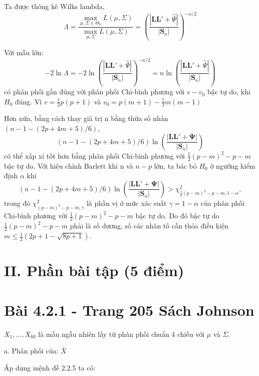 \documentclass{article}
\begin{document}
Ta được thông kê Wilks lambda,
\[
\Lambda = \frac{\max_{\mu, \Sigma \in \Theta_0} L(\mu, \Sigma)}{\max_{\mu, \Sigma} L(\mu, \Sigma)} = \left( \frac{| \mathbf{LL}' + \hat{\Psi} |}{|\mathbf{S}_n|} \right)^{-n/2}
\]

Với mẫu lớn:
\[
-2 \ln \Lambda = -2 \ln \left( \frac{| \mathbf{LL}' + \hat{\Psi} |}{|\mathbf{S}_n|} \right)^{-n/2} = n \ln \left( \frac{| \mathbf{LL}' + \hat{\Psi} |}{|\mathbf{S}_n|} \right)
\]
có phân phối gần đúng với phân phối Chi-bình phương với $v - v_0$ bậc tự do, khi $H_0$ đúng. Vì $v = \frac{1}{2} p (p+1)$ và $v_0 = p(m+1) - \frac{1}{2} m(m-1)$

Hơn nữa, bằng cách thay giá trị n bằng thừa số nhân \((n-1-(2p+4m+5)/6)\),
\[
(n-1-(2p+4m+5)/6) \ln \left( \frac{ | \mathbf{L}\mathbf{L}' + \mathbf{\Psi} | }{ | \mathbf{S}_n | } \right)
\]
có thể xấp xỉ tốt hơn bằng phân phối Chi-bình phương với \(\frac{1}{2}(p-m)^2 - p - m\) bậc tự do. Với hiệu chỉnh Barlett khi n và \(n-p\) lớn, ta bác bỏ \(H_0\) ở ngưỡng kiểm định \(\alpha\) khi
\[
(n-1-(2p+4m+5)/6) \ln \left( \frac{ | \mathbf{L}\mathbf{L}' + \mathbf{\Psi} | }{ | \mathbf{S}_n | } \right) > \chi^2_{\frac{1}{2}(p-m)^2-p-m, 1-\alpha},
\]
trong đó \(\chi^2_{(p-m)^2-p-m, \gamma}\) là phần vị ở mức xác suất \(\gamma = 1-\alpha\) của phân phối Chi-bình phương với \(\frac{1}{2}(p-m)^2 - p - m\) bậc tự do. Do đó bậc tự do \(\frac{1}{2}(p-m)^2 - p - m\) phải là số dương, số các nhân tố cần thỏa điều kiện \(m \leq \frac{1}{2}(2p+1-\sqrt{8p+1})\).



\vspace{1cm}
\section* {II. Phần bài tập (5 điểm)}
\vspace{0cm}






\section* {Bài 4.2.1 - Trang 205 Sách Johnson}

$X_1, \ldots, X_{60}$ là mẫu ngẫu nhiên lấy từ phân phối chuẩn 4 chiều với $\mu$ và $\Sigma$.
\vspace{0.6cm}

a. Phân phối của: $\bar{X}$

Áp dụng mệnh đề 2.2.5 ta có:
\end{document}
